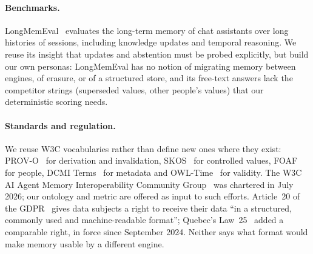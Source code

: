\paragraph{Benchmarks.}
LongMemEval~\cite{wu2025longmemeval} evaluates the long-term memory of chat assistants over long
histories of sessions, including knowledge updates and temporal reasoning. We reuse its insight
that updates and abstention must be probed explicitly, but build our own personas: LongMemEval has
no notion of migrating memory between engines, of erasure, or of a structured store, and its
free-text answers lack the competitor strings (superseded values, other people's values) that our
deterministic scoring needs.

\paragraph{Standards and regulation.}
We reuse W3C vocabularies rather than define new ones where they exist: PROV-O~\cite{provo} for
derivation and invalidation, SKOS~\cite{skos} for controlled values, FOAF~\cite{foaf} for people,
DCMI Terms~\cite{dcterms} for metadata and OWL-Time~\cite{owltime} for validity. The W3C AI Agent
Memory Interoperability Community Group~\cite{w3cmemcg2026} was chartered in July 2026; our
ontology and metric are offered as input to such efforts. Article~20 of the GDPR~\cite{gdpr}
gives data subjects a right to receive their data ``in a structured, commonly used and
machine-readable format''; Quebec's Law~25~\cite{quebec25} added a comparable right, in force since September 2024.
Neither says what format would make memory usable by a different engine.
